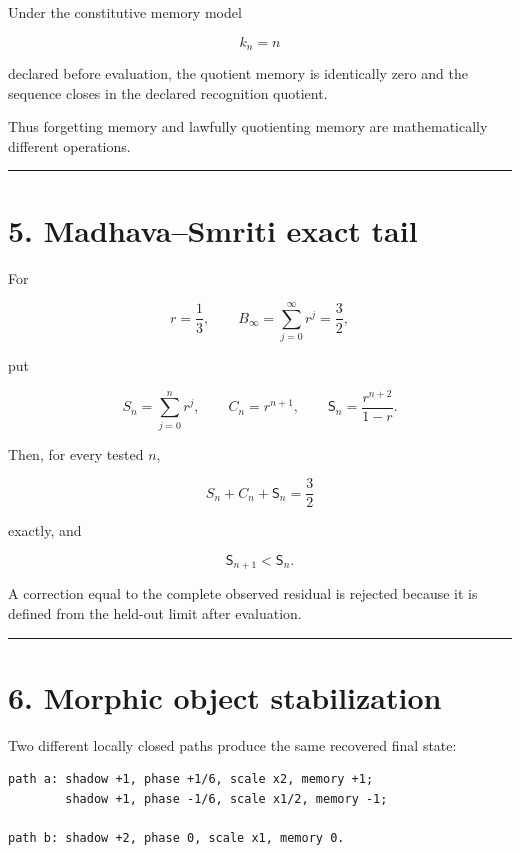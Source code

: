 Under the constitutive memory model

\[
k_n=n
\]

declared before evaluation, the quotient memory is identically zero and the sequence closes in the declared recognition quotient.

Thus forgetting memory and lawfully quotienting memory are mathematically different operations.

\begin{center}\rule{0.5\linewidth}{0.5pt}\end{center}

\hypertarget{madhavasmriti-exact-tail}{%
\section{5. Madhava--Smriti exact tail}\label{madhavasmriti-exact-tail}}

For

\[
r=\frac13,
\qquad
B_\infty=\sum_{j=0}^{\infty}r^j=\frac32,
\]

put

\[
S_n=\sum_{j=0}^{n}r^j,
\qquad
C_n=r^{n+1},
\qquad
\mathsf S_n=\frac{r^{n+2}}{1-r}.
\]

Then, for every tested \(n\),

\[
\boxed{
S_n+C_n+\mathsf S_n=\frac32
}
\]

exactly, and

\[
\mathsf S_{n+1}<\mathsf S_n.
\]

A correction equal to the complete observed residual is rejected because it is defined from the held-out limit after evaluation.

\begin{center}\rule{0.5\linewidth}{0.5pt}\end{center}

\hypertarget{morphic-object-stabilization}{%
\section{6. Morphic object stabilization}\label{morphic-object-stabilization}}

Two different locally closed paths produce the same recovered final state:

\begin{verbatim}
path a: shadow +1, phase +1/6, scale x2, memory +1;
        shadow +1, phase -1/6, scale x1/2, memory -1;

path b: shadow +2, phase 0, scale x1, memory 0.
\end{verbatim}

